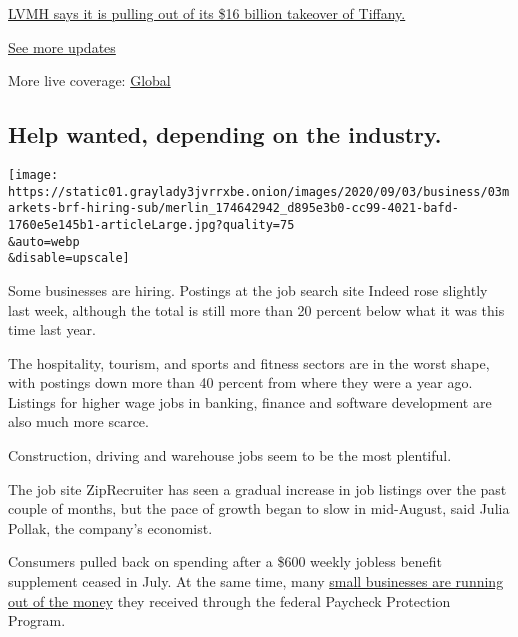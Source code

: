 \href{https://www.nytimes3xbfgragh.onion/live/2020/09/09/business/stock-market-today-coronavirus?action=click\&pgtype=Article\&state=default\&region=MAIN_CONTENT_1\&context=storylines_live_updates\#lvmh-says-it-is-pulling-out-of-its-16-billion-takeover-of-tiffany}{LVMH
says it is pulling out of its \$16 billion takeover of Tiffany.}

\href{https://www.nytimes3xbfgragh.onion/live/2020/09/09/business/stock-market-today-coronavirus?action=click\&pgtype=Article\&state=default\&region=MAIN_CONTENT_1\&context=storylines_live_updates}{See
more updates}

More live coverage:
\href{https://www.nytimes3xbfgragh.onion/2020/09/09/world/covid-19-coronavirus.html?action=click\&pgtype=Article\&state=default\&region=MAIN_CONTENT_1\&context=storylines_live_updates}{Global}

\hypertarget{help-wanted-depending-on-the-industry}{%
\subsection{Help wanted, depending on the
industry.}\label{help-wanted-depending-on-the-industry}}

\texttt{[image: https://static01.graylady3jvrrxbe.onion/images/2020/09/03/business/03markets-brf-hiring-sub/merlin\_174642942\_d895e3b0-cc99-4021-bafd-1760e5e145b1-articleLarge.jpg?quality=75\\\&auto=webp\\\&disable=upscale]}

Some businesses are hiring. Postings at the job search site Indeed rose
slightly last week, although the total is still more than 20 percent
below what it was this time last year.

The hospitality, tourism, and sports and fitness sectors are in the
worst shape, with postings down more than 40 percent from where they
were a year ago. Listings for higher wage jobs in banking, finance and
software development are also much more scarce.

Construction, driving and warehouse jobs seem to be the most plentiful.

The job site ZipRecruiter has seen a gradual increase in job listings
over the past couple of months, but the pace of growth began to slow in
mid-August, said Julia Pollak, the company's economist.

Consumers pulled back on spending after a \$600 weekly jobless benefit
supplement ceased in July. At the same time, many
\href{https://www.nytimes3xbfgragh.onion/2020/09/01/business/economy/small-businesses-coronavirus.html}{small
businesses are running out of the money} they received through the
federal Paycheck Protection Program.

